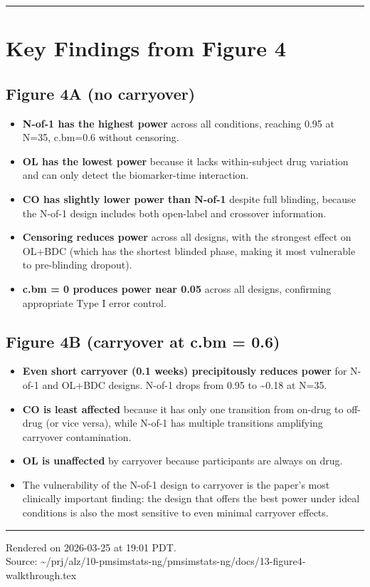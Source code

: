 \documentclass[11pt]{article}
\begin{document}
\bigskip\noindent\rule{\textwidth}{0.4pt}\bigskip

\section{Key Findings from Figure 4}

\subsection{Figure 4A (no carryover)}

\begin{itemize}
  \item \textbf{N-of-1 has the highest power} across all conditions, reaching
    0.95 at N=35, c.bm=0.6 without censoring.
  \item \textbf{OL has the lowest power} because it lacks within-subject drug
    variation and can only detect the biomarker-time interaction.
  \item \textbf{CO has slightly lower power than N-of-1} despite full blinding,
    because the N-of-1 design includes both open-label and
    crossover information.
  \item \textbf{Censoring reduces power} across all designs, with the strongest
    effect on OL+BDC (which has the shortest blinded phase,
    making it most vulnerable to pre-blinding dropout).
  \item \textbf{c.bm = 0 produces power near 0.05} across all designs,
    confirming appropriate Type I error control.
\end{itemize}

\subsection{Figure 4B (carryover at c.bm = 0.6)}

\begin{itemize}
  \item \textbf{Even short carryover (0.1 weeks) precipitously reduces power}
    for N-of-1 and OL+BDC designs. N-of-1 drops from 0.95 to
    \textasciitilde 0.18 at N=35.
  \item \textbf{CO is least affected} because it has only one transition from
    on-drug to off-drug (or vice versa), while N-of-1 has multiple
    transitions amplifying carryover contamination.
  \item \textbf{OL is unaffected} by carryover because participants are always
    on drug.
  \item The vulnerability of the N-of-1 design to carryover is the
    paper's most clinically important finding: the design that
    offers the best power under ideal conditions is also the most
    sensitive to even minimal carryover effects.
\end{itemize}

\vfill
\noindent\rule{\textwidth}{0.4pt}
{\footnotesize
Rendered on 2026-03-25 at 19:01 PDT.\\
Source: \textasciitilde/prj/alz/10-pmsimstats-ng/pmsimstats-ng/docs/13-figure4-walkthrough.tex}
\end{document}
